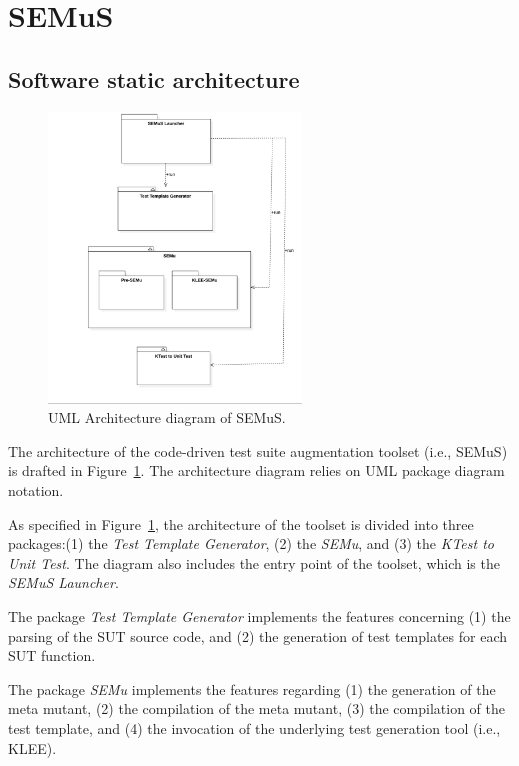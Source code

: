 
\section{SEMuS}

\subsection{Software static architecture}

\begin{figure}[tb]
  \centering
  \includegraphics[width=0.6\textwidth]{images/semus-arch-sdd}
      \caption{UML Architecture diagram of SEMuS.}
      \label{fig:architecture_diagram_semus}
\end{figure}

The architecture of the code-driven test suite augmentation toolset (i.e., SEMuS) is drafted in Figure~\ref{fig:architecture_diagram_semus}. The architecture diagram relies on UML package diagram notation.

As specified in Figure~\ref{fig:architecture_diagram_semus}, the architecture of the toolset is divided into three packages:(1) the \emph{Test Template Generator}, (2) the \emph{SEMu}, and (3) the \emph{KTest to Unit Test}. The diagram also includes the entry point of the toolset, which is the \emph{SEMuS Launcher}.

The package \emph{Test Template Generator} implements the features concerning (1) the parsing of the SUT source code, and (2) the generation of test templates for each SUT function.

The package \emph{SEMu} implements the features regarding (1) the generation of the meta mutant, (2) the compilation of the meta mutant, (3) the compilation of the test template, and (4) the invocation of the underlying test generation tool (i.e., KLEE).

